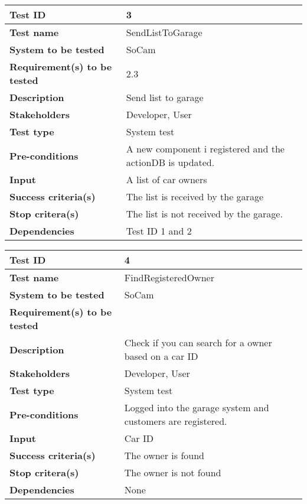 				\begin{table}[H]
			\begin{tabular}{| p{4cm} | p{10cm} |}
			\hline
			\rowcolor{gray}
				{\bf Test ID} & 3 \\ \hline
				{\bf Test name} & SendListToGarage \\ \hline
				{\bf System to be tested} & SoCam \\ \hline
				{\bf Requirement(s) to be tested} & 2.3 \\ \hline
				{\bf Description} & Send list to garage
				\\ \hline
				{\bf Stakeholders} & Developer, User \\ \hline
				{\bf Test type} & System test \\ \hline
				{\bf Pre-conditions} & A new component i registered and the actionDB is updated. 
				\\ \hline
				{\bf Input} & A list of car owners \\ \hline
				{\bf Success criteria(s)} & The list is received by the garage
				\\ \hline
				{\bf Stop critera(s)} &  The list is not received by the garage. \\ \hline
				{\bf Dependencies} & Test ID 1 and 2 \\ \hline
			\end{tabular}
		\end{table}

		\begin{table}[H]
			\begin{tabular}{| p{4cm} | p{10cm} |}
			\hline
			\rowcolor{gray}
				{\bf Test ID} & 4 \\ \hline
				{\bf Test name} & FindRegisteredOwner\\ \hline
				{\bf System to be tested} & SoCam \\ \hline
				{\bf Requirement(s) to be tested} &  \\ \hline
				{\bf Description} & Check if you can search for a owner based 
				on a car ID \\ \hline
				{\bf Stakeholders} & Developer, User \\ \hline
				{\bf Test type} & System test \\ \hline
				{\bf Pre-conditions} & Logged into the garage system and 
				customers are registered.\\ \hline
				{\bf Input} & Car ID \\ \hline
				{\bf Success criteria(s)} & The owner is found \\ \hline
				{\bf Stop critera(s)} & The owner is not found \\ \hline
				{\bf Dependencies} & None \\ \hline
			\end{tabular}
		\end{table}

